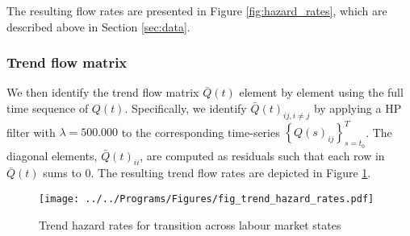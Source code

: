 The resulting flow rates are presented in Figure \ref{fig:hazard_rates}, which are described above in Section \ref{sec:data}.

\subsubsection{Trend flow matrix}
We then identify the trend flow matrix $\bar{Q}(t)$ element by element using the full time sequence of $Q(t)$. Specifically, we identify $\bar{Q}(t)_{ij, i \neq j}$ by applying a HP filter with $\lambda=500.000$ to the corresponding time-series $\left\{ {Q}(s)_{ij} \right\}_{s=t_{0}}^T$. The diagonal elements, $\bar{Q}(t)_{ii}$, are computed as residuals such that each row in $\bar{Q}(t)$ sums to 0. The resulting trend flow rates are depicted in Figure \ref{fig:trend_hazard_rates}.

\begin{landscape}
\begin{figure}
\centering
	\texttt{[image: ../../Programs/Figures/fig\_trend\_hazard\_rates.pdf]}
	\caption{Trend hazard rates for transition across labour market states}
	\label{fig:trend_hazard_rates}
\end{figure}
\end{landscape}


%
%
%
%
%





